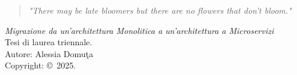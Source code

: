 \newpage
\thispagestyle{empty} %

\begin{quote}
    \centering
    \textit{"There may be late bloomers but there are no flowers that don't bloom."}
\end{quote}

\vspace*{\fill} %
\noindent
\textit{Migrazione da un'architettura Monolitica a un'architettura a Microservizi} \\
Tesi di laurea triennale. \\
Autore: Alessia Domu\c{t}a \\
Copyright: \copyright\  2025.

\newpage